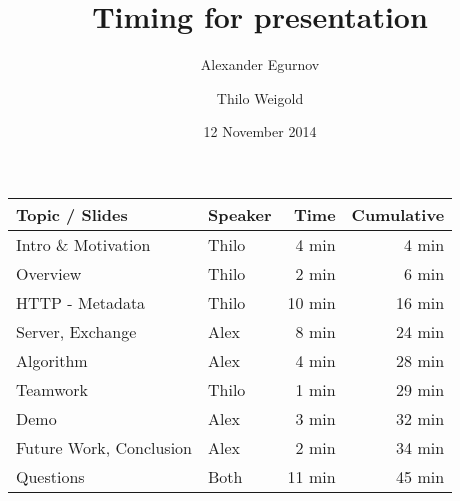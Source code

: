 \documentclass[a4paper]{article}
\title{Timing for presentation}
\author{Alexander Egurnov\\ \and Thilo Weigold}
\date{12 November 2014}
\begin{document}
\maketitle

\begin{table}[ht]
	\LARGE
	\begin{tabular}{llrr}
		Topic / Slides & Speaker & Time & Cumulative \\ 
		\hline
		Intro \& Motivation 	& Thilo & 4 min  & 4 min \\
		Overview 				& Thilo	& 2 min  & 6 min \\
		HTTP - Metadata			& Thilo	& 10 min & 16 min \\
		Server, Exchange		& Alex	& 8 min  & 24 min \\
		Algorithm				& Alex	& 4 min  & 28 min \\
		Teamwork				& Thilo & 1 min  & 29 min \\
		Demo					& Alex  & 3 min  & 32 min \\
		Future Work, Conclusion & Alex  & 2 min  & 34 min \\
		Questions				& Both  & 11 min & 45 min \\
	\end{tabular}
\end{table}
\end{document}

